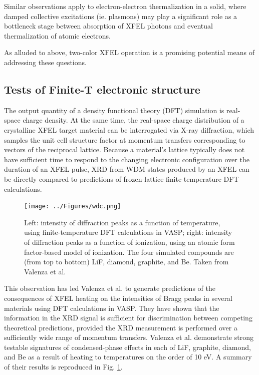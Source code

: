\documentclass [11pt, proquest, article] {uwthesis}[2016/11/22]
\begin{document}
Similar observations apply to electron-electron thermalization in a solid, where damped collective excitations (ie. plasmons) may play a significant role as a bottleneck stage between absorption of XFEL photons and eventual thermalization of atomic electrons.\cite{egerton1979k, sorini2006ab}%

As alluded to above, two-color XFEL operation is a promising potential means of addressing these questions. 

\subsection{Tests of Finite-T electronic structure}
\label{finite_t_theory}
The output quantity of a density functional theory (DFT) simulation is real-space charge density. At the same time, the real-space charge distribution of a crystalline XFEL target material can be interrogated via X-ray diffraction, which samples the unit cell structure factor at momentum transfers corresponding to vectors of the reciprocal lattice. Because a material's lattice typically does not have sufficient time to respond to the changing electronic configuration over the duration of an XFEL pulse, XRD from WDM states produced by an XFEL can be directly compared to predictions of frozen-lattice finite-temperature DFT calculations.

\begin{figure}[h] 
\caption{Left: intensity of diffraction peaks as a function of temperature, using finite-temperature DFT calculations in VASP; right: intensity of diffraction peaks as a function of ionization, using an atomic form factor-based model of ionization. The four simulated compounds are (from top to bottom) LiF, diamond, graphite, and Be. Taken from Valenza et al.\cite{valenza2016warm}}
\label{fig:wdc}
\centering
\texttt{[image: ../Figures/wdc.png]}
\end{figure}

\FloatBarrier

This observation has led Valenza et al. to generate predictions of the consequences of XFEL heating on the intensities of Bragg peaks in several materials using DFT calculations in VASP.\cite{valenza2016warm} They have shown that the information in the XRD signal is sufficient for discrimination between competing theoretical predictions, provided the XRD measurement is performed over a sufficiently wide range of momentum transfers. Valenza et al. demonstrate strong testable signatures of condensed-phase effects in each of LiF, graphite, diamond, and Be as a result of heating to temperatures on the order of 10 eV. A summary of their results is reproduced in Fig. \ref{fig:wdc}.
\end{document}
